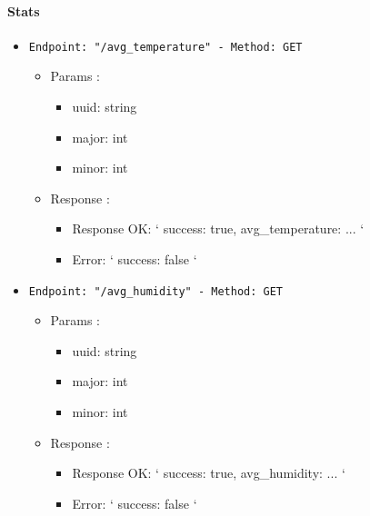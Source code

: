 \paragraph{Stats}

\begin{itemize}
  \item \texttt{Endpoint: "/avg_temperature" -  Method: GET}
  \begin{itemize} 
    \item Params :
    \begin{itemize}
      \item uuid: string
      \item major: int
      \item minor: int
    \end{itemize}

    \item Response : 
    \begin{itemize}
      \item Response OK: `{ success: true, avg_temperature: ... }`
      \item Error: `{ success: false }`
    \end{itemize}
  \end{itemize}
\end{itemize}

\begin{itemize}
  \item \texttt{Endpoint: "/avg_humidity" -  Method: GET}
  \begin{itemize} 
    \item Params :
    \begin{itemize}
      \item uuid: string
      \item major: int
      \item minor: int
    \end{itemize}

    \item Response : 
    \begin{itemize}
      \item Response OK: `{ success: true, avg_humidity: ... }`
      \item Error: `{ success: false }`
    \end{itemize}
  \end{itemize}
\end{itemize}

